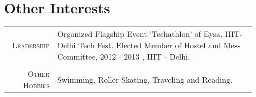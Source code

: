 \documentclass[a4paper,10pt]{article} %
\begin{document}
\section{\color{red} Other Interests}

\begin{tabular}{rp{13cm}}

\textsc{Leadership} & Organized Flagship Event 'Techathlon' of Eysa, IIIT-Delhi Tech Fest.\newline
			  Elected Member of Hostel and Mess Committee, 2012 - 2013 , IIIT - Delhi. \\ \\
\textsc{Other Hobbies} & Swimming, Roller Skating, Traveling and Reading.\\


\end{tabular}
\end{document}
